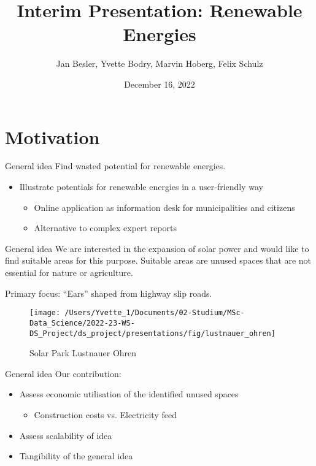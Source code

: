 \documentclass[
  ignorenonframetext,
]{beamer}
\title{Interim Presentation: Renewable Energies}
\author{Jan Besler, Yvette Bodry, Marvin Hoberg, Felix Schulz}
\date{December 16, 2022}
\begin{document}
\frame{\titlepage}

\begin{frame}[allowframebreaks]
  \tableofcontents[hideallsubsections]
\end{frame}
\hypertarget{motivation}{%
\section{Motivation}\label{motivation}}

\begin{frame}{General idea}
\protect\hypertarget{general-idea}{}
Find wasted potential for renewable energies.

\begin{itemize}

\item Illustrate potentials for renewable energies in a user-friendly way
\begin{itemize}
\item Online application as information desk for municipalities and citizens
\item Alternative to complex expert reports
\end{itemize}

\end{itemize}
\end{frame}

\begin{frame}{General idea}
\protect\hypertarget{general-idea-1}{}
We are interested in the expansion of solar power and would like to find
suitable areas for this purpose. Suitable areas are unused spaces that
are not essential for nature or agriculture.

Primary focus: ``Ears'' shaped from highway slip roads.

\begin{figure}
\texttt{[image: /Users/Yvette\_1/Documents/02-Studium/MSc-Data\_Science/2022-23-WS-DS\_Project/ds\_project/presentations/fig/lustnauer\_ohren]} \caption{Solar Park Lustnauer Ohren}\label{fig:unnamed-chunk-2}
\end{figure}
\end{frame}

\begin{frame}{General idea}
\protect\hypertarget{general-idea-2}{}
Our contribution:

\begin{itemize}
\item Assess economic utilisation of the identified unused spaces
\begin{itemize}
\item Construction costs vs. Electricity feed
\end{itemize}
\item Assess scalability of idea
\item Tangibility of the general idea
\end{itemize}
\end{frame}
\end{document}
